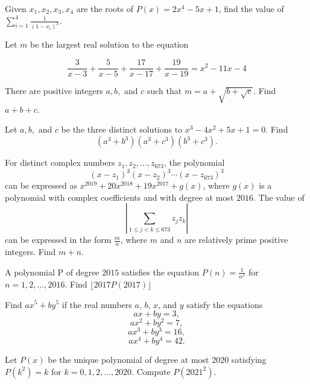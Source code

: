 \documentclass{article}
\begin{document}
\begin{prob}{6}

Given $x_1,x_2,x_3,x_4$ are the roots of $P(x)=2x^4-5x+1$, find the value of $\sum_{i=1}^4 \frac{1}{(1-x_i)^3}$.
\end{prob}

\begin{prob}[AIME I 2014/14]{6}

Let $m$ be the largest real solution to the equation

$$ \dfrac{3}{x-3} + \dfrac{5}{x-5} + \dfrac{17}{x-17} + \dfrac{19}{x-19} = x^2 - 11x - 4$$

There are positive integers $a, b,$ and $c$ such that $m = a + \sqrt{b + \sqrt{c}}$. Find $a+b+c$.
\end{prob}

\begin{prob}{6}
Let $a, b,$ and $c$ be the three distinct solutions to $x^{3} - 4x^{2} + 5x + 1 = 0$.
Find $$(a^3+b^3)(a^3+c^3)(b^3+c^3).$$
\end{prob}

\begin{prob}[AIME I 2019/10]{6}
For distinct complex numbers $z_1,z_2,\dots,z_{673}$, the polynomial\[(x-z_1)^3(x-z_2)^3 \cdots (x-z_{673})^3\]can be expressed as $x^{2019} + 20x^{2018} + 19x^{2017}+g(x)$, where $g(x)$ is a polynomial with complex coefficients and with degree at most $2016$. The value of\[\left| \sum_{1 \le j <k \le 673} z_jz_k \right|\]can be expressed in the form $\tfrac{m}{n}$, where $m$ and $n$ are relatively prime positive integers. Find $m+n$.
\end{prob}

\begin{prob}{9}
A polynomial P of degree $2015$ satisfies the equation $P(n) = \frac{1}{n^2}$ for $n = 1, 2, \ldots , 2016$. Find
$\lfloor 2017P(2017) \rfloor$
\end{prob}

\begin{prob}[AIME 1990/15]{9}
Find $ax^5 + by^5$ if the real numbers $a$, $b$, $x$, and $y$ satisfy the equations\[ax + by = 3,\]\[ax^2 + by^2 = 7,\]\[ax^3 + by^3 = 16,\]\[ax^4 + by^4 = 42.\]
\end{prob}


\begin{prob}{13}
Let $P(x)$ be the unique polynomial of degree at most $2020$ satisfying $P(k^2) = k$ for $k = 0, 1, 2, \ldots , 2020$.
Compute $P(2021^2)$.
\end{prob}
\end{document}
